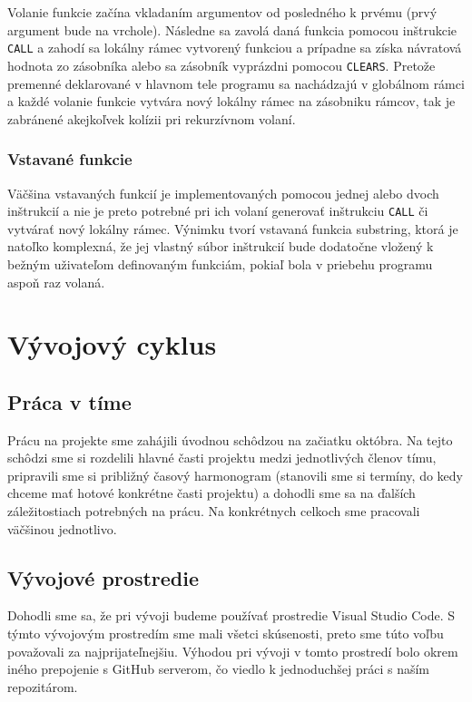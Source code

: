 \documentclass[a4paper,11pt]{article}
\begin{document}
Volanie funkcie začína vkladaním argumentov od posledného k prvému (prvý argument bude na vrchole). Následne sa zavolá daná funkcia pomocou inštrukcie \texttt{CALL} a zahodí sa lokálny rámec vytvorený funkciou a prípadne sa získa návratová hodnota zo zásobníka alebo sa zásobník vyprázdni pomocou \texttt{CLEARS}.
Pretože premenné deklarované v hlavnom tele programu sa nachádzajú v globálnom rámci a každé volanie funkcie vytvára nový lokálny rámec na zásobniku rámcov, tak je zabránené akejkoľvek kolízii pri rekurzívnom volaní. 

 \subsubsection{Vstavané funkcie}
 Väčšina vstavaných funkcií je implementovaných pomocou jednej alebo dvoch inštrukcií a nie je preto potrebné pri ich volaní generovať inštrukciu \texttt{CALL} či vytvárať nový lokálny rámec. Výnimku tvorí vstavaná funkcia substring, ktorá je natoľko komplexná, že jej vlastný súbor inštrukcií bude dodatočne vložený k bežným uživateľom definovaným funkciám, pokiaľ bola v priebehu programu aspoň raz volaná.






\section{Vývojový cyklus}
\subsection{Práca v tíme}
Prácu na projekte sme zahájili úvodnou schôdzou na začiatku októbra. Na tejto schôdzi sme si rozdelili hlavné časti projektu medzi jednotlivých členov tímu, pripravili sme si približný časový harmonogram (stanovili sme si termíny, do kedy chceme mať hotové konkrétne časti projektu) a dohodli sme sa na ďalších záležitostiach potrebných na prácu. Na konkrétnych celkoch sme pracovali väčšinou jednotlivo.

\subsection{Vývojové prostredie}
Dohodli sme sa, že pri vývoji budeme používať prostredie Visual Studio Code. S týmto vývojovým prostredím sme mali všetci skúsenosti, preto sme túto voľbu považovali za najprijateľnejšiu. Výhodou pri vývoji v tomto prostredí bolo okrem iného prepojenie s GitHub serverom, čo viedlo k jednoduchšej práci s naším repozitárom.
\end{document}
